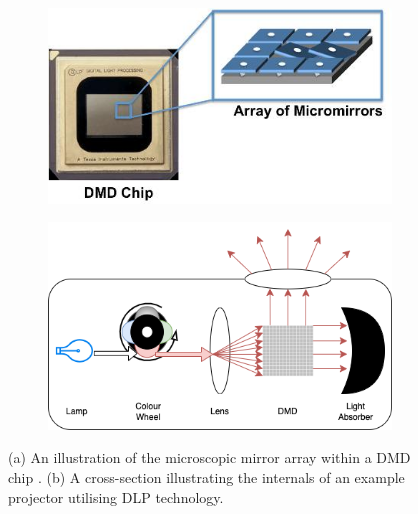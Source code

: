 \begin{figure}[h]
    \centering
    \begin{subfigure}{.3\textwidth}
        \centering
        \includegraphics[width=1\linewidth]{assets/dmd-chip.jpg}
        \caption{}
    \end{subfigure}
    \qquad
    \begin{subfigure}{.35\textwidth}
        \centering
        \includegraphics[width=1\linewidth]{assets/dlp-projector.png}
        \caption{}
    \end{subfigure}
    \caption{(a) An illustration of the microscopic mirror array within a DMD chip \cite{HowDoesDLP}. (b) A cross-section illustrating the internals of an example projector utilising DLP technology.}
    \label{fig:dmd_dlp}
\end{figure}

